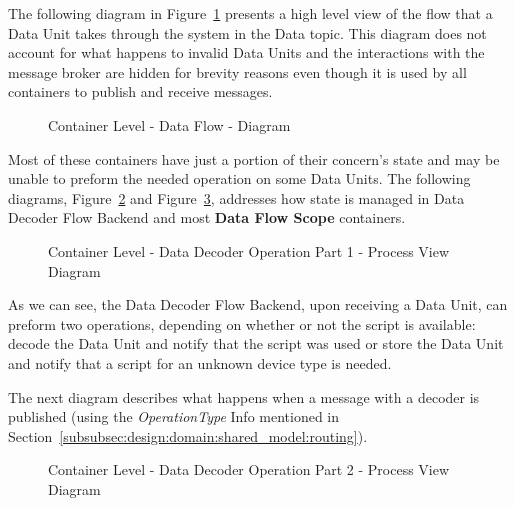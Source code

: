 The following diagram in Figure~\ref{fig:design:architecture:platform:container:process:diagram:flow} presents a high level view of the flow that a Data Unit takes through the system in the Data topic. This diagram does not account for what happens to invalid Data Units and the interactions with the message broker are hidden for brevity reasons even though it is used by all containers to publish and receive messages.

\begin{figure}[H]
   \centering
   \resizebox{\columnwidth}{!}
   {
      
   }
   \caption[Container Level - Data Flow - Diagram]{Container Level - Data Flow - Diagram}
   \label{fig:design:architecture:platform:container:process:diagram:flow}
\end{figure}

Most of these containers have just a portion of their concern's state and may be unable to preform the needed operation on some Data Units. The following diagrams, Figure~\ref{fig:design:architecture:platform:container:process:diagram:decoder:1} and Figure~\ref{fig:design:architecture:platform:container:process:diagram:decoder:2}, addresses how state is managed in Data Decoder Flow Backend and most \textbf{Data Flow Scope} containers.

\begin{figure}[H]
   \centering
   \resizebox{\columnwidth}{!}
   {
      
   }
   \caption[Container Level - Data Decoder Operation part 1 - Process View Diagram]{Container Level - Data Decoder Operation Part 1 - Process View Diagram}
   \label{fig:design:architecture:platform:container:process:diagram:decoder:1}
\end{figure}

As we can see, the Data Decoder Flow Backend, upon receiving a Data Unit, can preform two operations, depending on whether or not the script is available: decode the Data Unit and notify that the script was used or store the Data Unit and notify that a script for an unknown device type is needed.

The next diagram describes what happens when a message with a decoder is published (using the \textit{OperationType} Info mentioned in Section~\ref{subsubsec:design:domain:shared_model:routing}).

\begin{figure}[H]
   \centering
   \resizebox{0.8\columnwidth}{!}
   {
      
   }
   \caption[Container Level - Data Decoder Operation Part 2 - Process View Diagram]{Container Level - Data Decoder Operation Part 2 - Process View Diagram}
   \label{fig:design:architecture:platform:container:process:diagram:decoder:2}
\end{figure}

